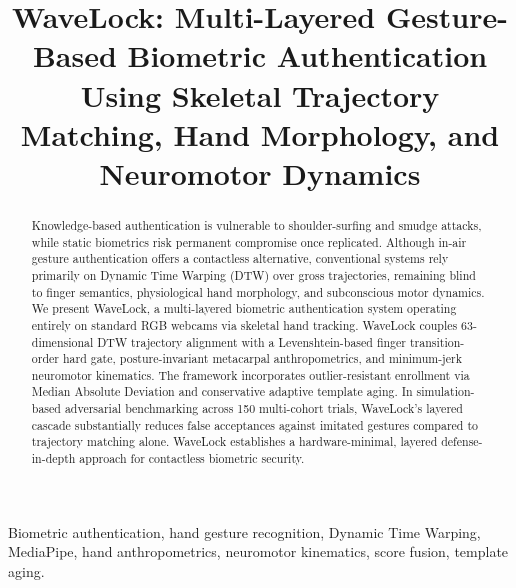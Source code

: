 \documentclass[conference]{IEEEtran}
\begin{document}
\title{WaveLock: Multi-Layered Gesture-Based Biometric Authentication Using Skeletal Trajectory Matching, Hand Morphology, and Neuromotor Dynamics}

\author{
}

\maketitle

\begin{abstract}
Knowledge-based authentication is vulnerable to shoulder-surfing and smudge attacks, while static biometrics risk permanent compromise once replicated. Although in-air gesture authentication offers a contactless alternative, conventional systems rely primarily on Dynamic Time Warping (DTW) over gross trajectories, remaining blind to finger semantics, physiological hand morphology, and subconscious motor dynamics. We present WaveLock, a multi-layered biometric authentication system operating entirely on standard RGB webcams via skeletal hand tracking. WaveLock couples 63-dimensional DTW trajectory alignment with a Levenshtein-based finger transition-order hard gate, posture-invariant metacarpal anthropometrics, and minimum-jerk neuromotor kinematics. The framework incorporates outlier-resistant enrollment via Median Absolute Deviation and conservative adaptive template aging. In simulation-based adversarial benchmarking across 150 multi-cohort trials, WaveLock's layered cascade substantially reduces false acceptances against imitated gestures compared to trajectory matching alone. WaveLock establishes a hardware-minimal, layered defense-in-depth approach for contactless biometric security.
\end{abstract}

\begin{IEEEkeywords}
Biometric authentication, hand gesture recognition, Dynamic Time Warping, MediaPipe, hand anthropometrics, neuromotor kinematics, score fusion, template aging.
\end{IEEEkeywords}
\end{document}

